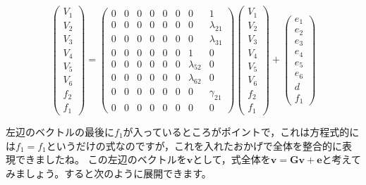 \documentclass{ltjsbook}
\begin{document}
\[
    \begin{pmatrix} V_1 \\ V_2 \\ V_3 \\ V_4 \\ V_5 \\ V_6 \\ f_2 \\f_1 \end{pmatrix} =
    \begin{pmatrix} 0 & 0 & 0 & 0 & 0 & 0 & 0            & 1            \\
                0 & 0 & 0 & 0 & 0 & 0 & 0            & \lambda_{21} \\
                0 & 0 & 0 & 0 & 0 & 0 & 0            & \lambda_{31} \\
                0 & 0 & 0 & 0 & 0 & 0 & 1            & 0            \\
                0 & 0 & 0 & 0 & 0 & 0 & \lambda_{52} & 0            \\
                0 & 0 & 0 & 0 & 0 & 0 & \lambda_{62} & 0            \\
                0 & 0 & 0 & 0 & 0 & 0 & 0            & \gamma_{21}  \\
                0 & 0 & 0 & 0 & 0 & 0 & 0            & 0\end{pmatrix}
    \begin{pmatrix} V_1 \\ V_2 \\ V_3 \\ V_4 \\ V_5 \\ V_6 \\ f_2 \\f_1 \end{pmatrix} +
    \begin{pmatrix} e_1 \\ e_2 \\ e_3 \\ e_4 \\ e_5 \\ e_6 \\ d \\f_1 \end{pmatrix}
\]

左辺のベクトルの最後に$f_1$が入っているところがポイントで，これは方程式的には$f_1=f_1$というだけの式なのですが，これを入れたおかげで全体を整合的に表現できましたね。
この左辺のベクトルを$\bm{v}$として，式全体を$\bm{v} = \bm{Gv}+\bm{e}$と考えてみましょう。すると次のように展開できます。
\end{document}
